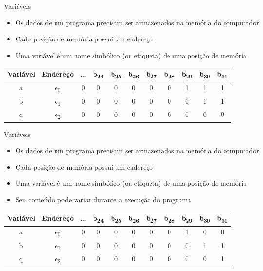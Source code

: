 \documentclass[t, aspectratio=169]{beamer}
\begin{document}
\begin{frame}[label={sec:org0e1a331}]{Variáveis}
\begin{itemize}
\item Os dados de um programa precisam ser armazenados na \alert{memória} do computador
\item Cada posição de memória possui um \alert{endereço}
\item Uma variável é um \alert{nome simbólico} (ou etiqueta) de uma posição de memória
\end{itemize}
\vfill{}\vspace{0.575cm}
\begin{center}
\begin{tabular}{*{11}{c}}
\toprule
\alert{Variável} & \alert{Endereço} & \alert{\ldots{}} & \alert{b\textsubscript{24}} & \alert{b\textsubscript{25}} & \alert{b\textsubscript{26}} & \alert{b\textsubscript{27}} & \alert{b\textsubscript{28}} & \alert{b\textsubscript{29}} & \alert{b\textsubscript{30}} & \alert{b\textsubscript{31}}\\
\midrule
a & e\textsubscript{0} & 0 & 0 & 0 & 0 & 0 & 0 & 1 & 1 & 1\\
b & e\textsubscript{1} & 0 & 0 & 0 & 0 & 0 & 0 & 0 & 1 & 1\\
q & e\textsubscript{2} & 0 & 0 & 0 & 0 & 0 & 0 & 0 & 0 & 0\\
\bottomrule
\end{tabular}
\end{center}
\end{frame}

\begin{frame}[label={sec:orgc2fcf93}]{Variáveis}
\begin{itemize}
\item Os dados de um programa precisam ser armazenados na \alert{memória} do computador
\item Cada posição de memória possui um \alert{endereço}
\item Uma variável é um \alert{nome simbólico} (ou etiqueta) de uma posição de memória
\item Seu \alert{conteúdo pode variar} durante a execução do programa
\end{itemize}
\vfill{}
\begin{center}
\begin{tabular}{*{11}{c}}
\toprule
\alert{Variável} & \alert{Endereço} & \alert{\ldots{}} & \alert{b\textsubscript{24}} & \alert{b\textsubscript{25}} & \alert{b\textsubscript{26}} & \alert{b\textsubscript{27}} & \alert{b\textsubscript{28}} & \alert{b\textsubscript{29}} & \alert{b\textsubscript{30}} & \alert{b\textsubscript{31}}\\
\midrule
a & e\textsubscript{0} & 0 & 0 & 0 & 0 & 0 & 0 & 1 & \alert{0} & \alert{0}\\
b & e\textsubscript{1} & 0 & 0 & 0 & 0 & 0 & 0 & 0 & 1 & 1\\
q & e\textsubscript{2} & 0 & 0 & 0 & 0 & 0 & 0 & 0 & 0 & \alert{1}\\
\bottomrule
\end{tabular}
\end{center}
\end{frame}
\end{document}

